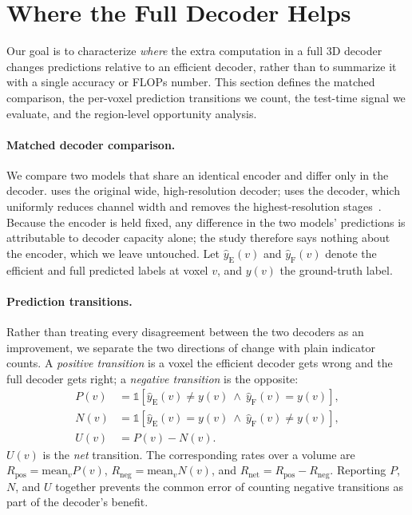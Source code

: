 \section{Where the Full Decoder Helps}
\label{sec:study}

Our goal is to characterize \emph{where} the extra computation in a full 3D
decoder changes predictions relative to an efficient decoder, rather than to
summarize it with a single accuracy or FLOPs number.  This section defines the
matched comparison, the per-voxel prediction transitions we count, the
test-time signal we evaluate, and the region-level opportunity analysis.

\paragraph{Matched decoder comparison.}
We compare two models that share an identical encoder and differ only in the
decoder.  \fullmodel{} uses the original wide, high-resolution decoder;
\effimodel{} uses the \method{} decoder, which uniformly reduces channel width
and removes the highest-resolution stages~\cite{rahman2025effidec3d}.  Because
the encoder is held fixed, any difference in the two models' predictions is
attributable to decoder capacity alone; the study therefore says nothing about
the encoder, which we leave untouched.  Let $\hat{y}_{\mathrm{E}}(v)$ and
$\hat{y}_{\mathrm{F}}(v)$ denote the efficient and full predicted labels at
voxel $v$, and $y(v)$ the ground-truth label.

\paragraph{Prediction transitions.}
Rather than treating every disagreement between the two decoders as an
improvement, we separate the two directions of change with plain indicator
counts.  A \emph{positive transition} is a voxel the efficient decoder gets
wrong and the full decoder gets right; a \emph{negative transition} is the
opposite:
\begin{align}
P(v) &= \mathbb{1}\!\left[\hat{y}_{\mathrm{E}}(v)\neq y(v)\ \wedge\ \hat{y}_{\mathrm{F}}(v)=y(v)\right],\\
N(v) &= \mathbb{1}\!\left[\hat{y}_{\mathrm{E}}(v)=y(v)\ \wedge\ \hat{y}_{\mathrm{F}}(v)\neq y(v)\right],\\
U(v) &= P(v)-N(v).
\label{eq:transitions}
\end{align}
$U(v)$ is the \emph{net} transition.  The corresponding rates over a volume are
$R_{\mathrm{pos}}=\mathrm{mean}_v P(v)$, $R_{\mathrm{neg}}=\mathrm{mean}_v N(v)$,
and $R_{\mathrm{net}}=R_{\mathrm{pos}}-R_{\mathrm{neg}}$.  Reporting $P$, $N$,
and $U$ together prevents the common error of counting negative transitions as
part of the decoder's benefit.

